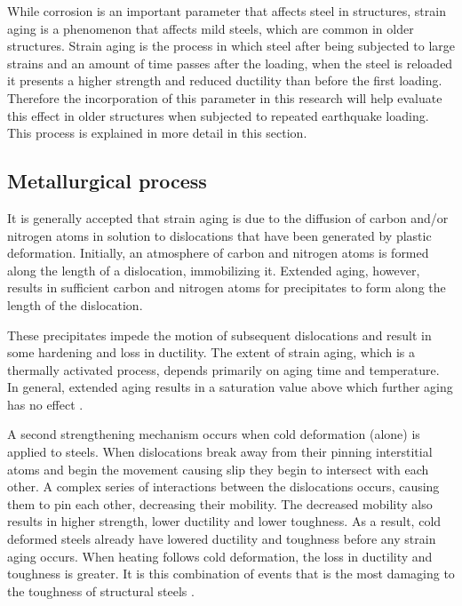 While corrosion is an important parameter that affects steel in structures, strain aging is a phenomenon that affects mild steels, which are common in older structures. Strain aging is the process in which steel after being subjected to large strains and an amount of time passes after the loading, when the steel is reloaded it presents a higher strength and reduced ductility than before the first loading. Therefore the incorporation of this parameter in this research will help evaluate this effect in older structures when subjected to repeated earthquake loading. This process is explained in more detail in this section.

\subsection{Metallurgical process}

It is generally accepted that strain aging is due to the diffusion of carbon and/or nitrogen atoms in solution to dislocations that have been generated by plastic deformation. Initially, an atmosphere of carbon and nitrogen atoms is formed along the length of a dislocation, immobilizing it. Extended aging, however, results in sufficient carbon and nitrogen atoms for precipitates to form along the length of the dislocation\cite{Overby2017}\cite{Hosseini2015}.

These precipitates impede the motion of subsequent dislocations and result in some hardening and loss in ductility. The extent of strain aging, which is a thermally activated process, depends primarily on aging time and temperature. In general, extended aging results in a saturation value above which further aging has no effect \cite{Restrepo-Posada1994}.

A second strengthening mechanism occurs when cold deformation (alone) is applied to steels. When dislocations break away from their pinning interstitial atoms and begin the movement causing slip they begin to intersect with each other. A complex series of interactions between the dislocations occurs, causing them to pin each other, decreasing their mobility. The decreased mobility also results in higher strength, lower ductility and lower toughness. As a result, cold deformed steels already have lowered ductility and toughness before any strain aging occurs. When heating follows cold deformation, the loss in ductility and toughness is greater. It is this combination of events that is the most damaging to the toughness of structural steels \cite{Momtahan2009}.

